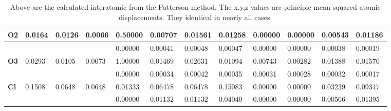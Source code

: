 \documentclass[]{scrartcl}
\begin{document}
\begin{table}[]
\begin{tabular}{|l|l|l|l|l|l|l|l|l|l|l|l|}
		\textbf{O2}                         & 0.0164                          & 0.0126                          & 0.0066                          & 0.50000                           & 0.00707                           & 0.01561                           & 0.01258                           & 0.00000                           & 0.00000                           & 0.00543                           & 0.01186                           \\ \hline
		\textbf{}                           &                                 &                                 &                                 & 0.00000                           & 0.00041                           & 0.00048                           & 0.00047                           & 0.00000                           & 0.00000                           & 0.00038                           & 0.00019                           \\ \hline
		\textbf{O3}                         & 0.0293                          & 0.0105                          & 0.0073                          & 1.00000                           & 0.01469                           & 0.02631                           & 0.01094                           & 0.00743                           & 0.00282                           & 0.01388                           & 0.01570                           \\ \hline
		\textbf{}                           &                                 &                                 &                                 & 0.00000                           & 0.00034                           & 0.00042                           & 0.00035                           & 0.00031                           & 0.00028                           & 0.00032                           & 0.00017                           \\ \hline
		\textbf{Cl}                         & 0.1508                          & 0.0648                          & 0.0648                          & 0.01333                           & 0.06478                           & 0.06478                           & 0.15083                           & 0.00000                           & 0.00000                           & 0.03239                           & 0.09347                           \\ \hline
		&                                 &                                 &                                 & 0.00000                           & 0.01132                           & 0.01132                           & 0.04040                           & 0.00000                           & 0.00000                           & 0.00566                           & 0.01395                           \\ \hline
	\end{tabular}
		\caption{Above are the calculated interatomic from the Patterson method. The x,y,z values are principle mean squared atomic displacements. They identical in nearly all cases.}
	\end{table}
\end{document}
